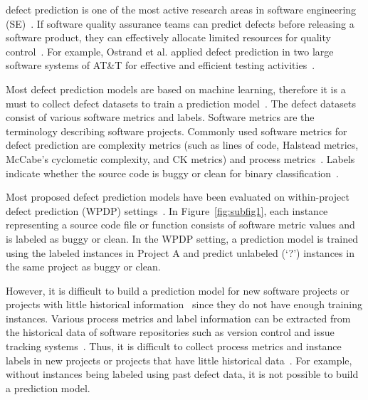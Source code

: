  defect prediction is one of the most active research areas in
software
engineering (SE)~\cite{DAmbros12,Fukushima14,Lee11,Lessmann08,Li12,Menzies07,Nam13,Rahman12,Shivaji13,Zimmermann08,Zimmermann09}.
If software quality assurance teams can predict defects before releasing a
software product, they can effectively allocate limited
resources for quality control~\cite{Menzies07,Ostrand05,Rahman12,Zimmermann08}.
For example, Ostrand et al. applied defect prediction in two large software systems
of AT\&T for effective and efficient testing activities~\cite{Ostrand05}.

Most defect prediction models are based on
machine learning, therefore it is a must to collect defect datasets
to train a prediction model~\cite{DAmbros12,Menzies07}. The
defect datasets consist of various software metrics and labels. Software metrics are the terminology describing software projects. Commonly
used software metrics for defect prediction are complexity metrics (such as lines of code, Halstead
metrics, McCabe's cyclometic complexity, and CK metrics) and
process metrics~\cite{Basili96,Halstead77,McCabe76,Rahman13}. Labels indicate
whether the source code is buggy or clean for binary
classification~\cite{Lee11,Nam13}.

Most proposed defect prediction models have been evaluated on
within-project defect prediction (WPDP)
settings~\cite{DAmbros12,Lee11,Menzies07}.
In Figure~\ref{fig:subfig1}, each instance representing a source code file or
function consists of software metric values and is labeled as buggy or clean.
In the WPDP setting, a prediction model is
trained using the labeled instances in Project A and predict unlabeled (`?')
instances in the same project as buggy or clean.

However, it is difficult to build a prediction model for new
software projects or projects with little historical
information~\cite{Zimmermann09} since they do not have enough training
instances. Various process metrics and label information can be extracted from
the historical data of software repositories such as version control and issue
tracking systems~\cite{Rahman13}.
Thus, it is difficult to collect process metrics and instance
labels in new projects or projects that have little historical
data~\cite{Fukushima14,Nam13,Zimmermann09}. For example, without instances being
labeled using past defect data, it is not possible to build a prediction model.


